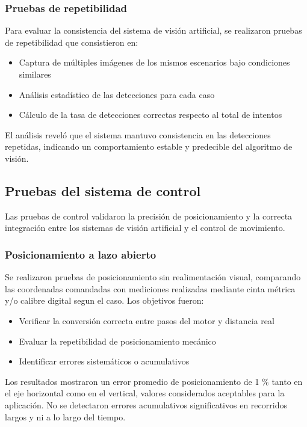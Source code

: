 \subsubsection{Pruebas de repetibilidad}

Para evaluar la consistencia del sistema de visión artificial, se realizaron pruebas de repetibilidad que consistieron en:

\begin{itemize}[label=$\bullet$]
    \item Captura de múltiples imágenes de los mismos escenarios bajo condiciones similares
    \item Análisis estadístico de las detecciones para cada caso
    \item Cálculo de la tasa de detecciones correctas respecto al total de intentos
\end{itemize}

El análisis reveló que el sistema mantuvo consistencia en las detecciones repetidas, indicando un comportamiento estable y predecible del algoritmo de visión.

\subsection{Pruebas del sistema de control}

Las pruebas de control validaron la precisión de posicionamiento y la correcta integración entre los sistemas de visión artificial y el control de movimiento.

\subsubsection{Posicionamiento a lazo abierto}

Se realizaron pruebas de posicionamiento sin realimentación visual, comparando las coordenadas comandadas con mediciones realizadas mediante cinta métrica y/o calibre digital segun el caso. Los objetivos fueron:

\begin{itemize}[label=$\bullet$]
    \item Verificar la conversión correcta entre pasos del motor y distancia real
    \item Evaluar la repetibilidad de posicionamiento mecánico
    \item Identificar errores sistemáticos o acumulativos
\end{itemize}

Los resultados mostraron un error promedio de posicionamiento de 1 $\%$ tanto en el eje horizontal como en el vertical, valores considerados aceptables para la aplicación. No se detectaron errores acumulativos significativos en recorridos largos y ni a lo largo del tiempo.

